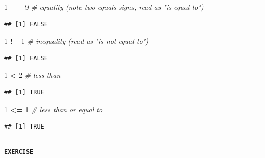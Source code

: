 \documentclass[
]{book}
\newenvironment{Shaded}{\begin{snugshade}}{\end{snugshade}}
\newcommand{\CommentTok}[1]{\textcolor[rgb]{0.56,0.35,0.01}{\textit{#1}}}
\newcommand{\DecValTok}[1]{\textcolor[rgb]{0.00,0.00,0.81}{#1}}
\newcommand{\SpecialCharTok}[1]{\textcolor[rgb]{0.81,0.36,0.00}{\textbf{#1}}}
\begin{document}
\begin{Shaded}
\begin{Highlighting}[]
\DecValTok{1} \SpecialCharTok{==} \DecValTok{9}  \CommentTok{\# equality (note two equals signs, read as "is equal to")}
\end{Highlighting}
\end{Shaded}

\begin{verbatim}
## [1] FALSE
\end{verbatim}

\begin{Shaded}
\begin{Highlighting}[]
\DecValTok{1} \SpecialCharTok{!=} \DecValTok{1}  \CommentTok{\# inequality (read as "is not equal to")}
\end{Highlighting}
\end{Shaded}

\begin{verbatim}
## [1] FALSE
\end{verbatim}

\begin{Shaded}
\begin{Highlighting}[]
\DecValTok{1} \SpecialCharTok{\textless{}} \DecValTok{2}  \CommentTok{\# less than}
\end{Highlighting}
\end{Shaded}

\begin{verbatim}
## [1] TRUE
\end{verbatim}

\begin{Shaded}
\begin{Highlighting}[]
\DecValTok{1} \SpecialCharTok{\textless{}=} \DecValTok{1}  \CommentTok{\# less than or equal to}
\end{Highlighting}
\end{Shaded}

\begin{verbatim}
## [1] TRUE
\end{verbatim}

\begin{center}\rule{0.5\linewidth}{0.5pt}\end{center}

\textbf{\texttt{EXERCISE}}
\end{document}
